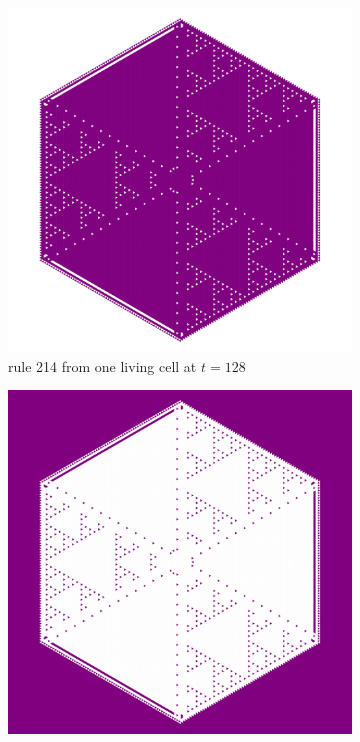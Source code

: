 \documentclass{article}
\begin{document}
\begin{figure}[H]
     \centering
     \begin{subfigure}[b]{0.48\textwidth}
         \centering
         \includegraphics[width=\textwidth]{graphics/behavior/twins/rule-214-OneAlive.jpg}
         \caption{rule 214 from one living cell at $t=128$}
         \label{fig:twin-1}
     \end{subfigure}
     \hspace{0.02\textwidth}
     \begin{subfigure}[b]{0.48\textwidth}
         \centering
         \includegraphics[width=\textwidth]{graphics/behavior/twins/rule-148-OneDead.jpg}

\end{subfigure}
\end{figure}
\end{document}
